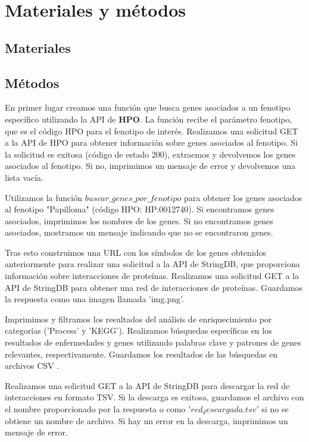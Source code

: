 \section{Materiales y métodos}

\subsection{Materiales}

\subsection{Métodos}
En primer lugar creamos una función que busca genes asociados a un fenotipo específico utilizando la API de \textbf{HPO}.
La función recibe el parámetro fenotipo, que es el código HPO para el fenotipo de interés.
Realizamos una solicitud GET a la API de HPO para obtener información sobre genes asociados al fenotipo.
Si la solicitud es exitosa (código de estado 200), extraemos y devolvemos los genes asociados al fenotipo. Si no, imprimimos un mensaje de error y devolvemos una lista vacía.


Utilizamos la función $buscar\_genes\_por\_fenotipo$ para obtener los genes asociados al fenotipo "Papilloma" (código HPO: HP:0012740).
Si encontramos genes asociados, imprimimos los nombres de los genes. Si no encontramos genes asociados, mostramos un mensaje indicando que no se encontraron genes.

Tras esto construimos una URL con los símbolos de los genes obtenidos anteriormente para realizar una solicitud a la API de StringDB, que proporciona información sobre interacciones de proteínas.
Realizamos una solicitud GET a la API de StringDB para obtener una red de interacciones de proteínas.
Guardamos la respuesta como una imagen llamada 'img.png'.

Imprimimos y filtramos los resultados del análisis de enriquecimiento por categorías ('Process' y 'KEGG').
Realizamos búsquedas específicas en los resultados de enfermedades y genes utilizando palabras clave y patrones de genes relevantes, respectivamente.
Guardamos los resultados de las búsquedas en archivos CSV .

Realizamos una solicitud GET a la API de StringDB para descargar la red de interacciones en formato TSV.
Si la descarga es exitosa, guardamos el archivo con el nombre proporcionado por la respuesta o como $'red_descargada.tsv'$ si no se obtiene un nombre de archivo.
Si hay un error en la descarga, imprimimos un mensaje de error.

